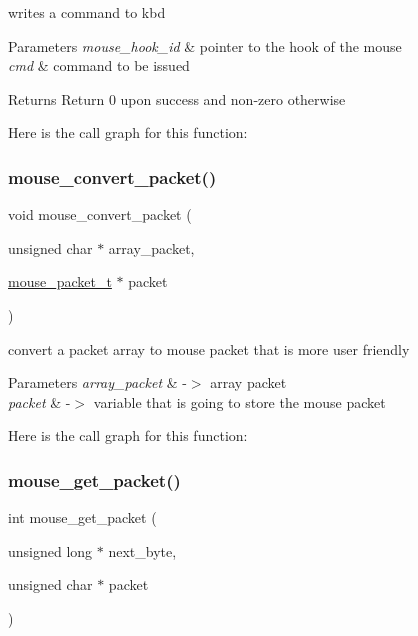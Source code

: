 writes a command to kbd 


\begin{DoxyParams}{Parameters}
{\em mouse\+\_\+hook\+\_\+id} & pointer to the hook of the mouse\\
\hline
{\em cmd} & command to be issued\\
\hline
\end{DoxyParams}
\begin{DoxyReturn}{Returns}
Return 0 upon success and non-\/zero otherwise 
\end{DoxyReturn}
Here is the call graph for this function\+:
\hypertarget{group__mouse_gaf1a4587fac965330aca5079ae1313327}{}\label{group__mouse_gaf1a4587fac965330aca5079ae1313327} 
\subsubsection{\texorpdfstring{mouse\+\_\+convert\+\_\+packet()}{mouse\_convert\_packet()}}
{\footnotesize\ttfamily void mouse\+\_\+convert\+\_\+packet (\begin{DoxyParamCaption}\item[{unsigned char $\ast$}]{array\+\_\+packet,  }\item[{\hyperlink{structmouse__packet__t}{mouse\+\_\+packet\+\_\+t} $\ast$}]{packet }\end{DoxyParamCaption})}



convert a packet array to mouse packet that is more user friendly 


\begin{DoxyParams}{Parameters}
{\em array\+\_\+packet} & -\/$>$ array packet \\
\hline
{\em packet} & -\/$>$ variable that is going to store the mouse packet \\
\hline
\end{DoxyParams}
Here is the call graph for this function\+:
\hypertarget{group__mouse_ga936c78f40a1d0b1acfd4f0368a9b8137}{}\label{group__mouse_ga936c78f40a1d0b1acfd4f0368a9b8137} 
\subsubsection{\texorpdfstring{mouse\+\_\+get\+\_\+packet()}{mouse\_get\_packet()}}
{\footnotesize\ttfamily int mouse\+\_\+get\+\_\+packet (\begin{DoxyParamCaption}\item[{unsigned long $\ast$}]{next\+\_\+byte,  }\item[{unsigned char $\ast$}]{packet }\end{DoxyParamCaption})}




